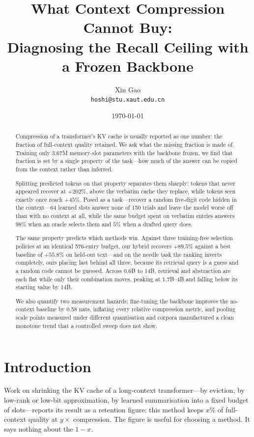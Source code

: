\documentclass[11pt]{article}
\title{What Context Compression Cannot Buy:\\
       Diagnosing the Recall Ceiling with a Frozen Backbone}
\author{Xin Gao\\
  \texttt{hoshi@stu.xaut.edu.cn}}
\date{\today}
\begin{document}
\maketitle

\begin{abstract}
Compression of a transformer's KV cache is usually reported as one number: the
fraction of full-context quality retained. We ask what the missing fraction is
made of. Training only 3.67M memory-slot parameters with the backbone frozen,
we find that fraction is set by a single property of the task---how much of the
answer can be copied from the context rather than inferred.

Splitting predicted tokens on that property separates them sharply: tokens that
never appeared recover at $+202\%$, above the verbatim cache they replace, while
tokens seen exactly once reach $+45\%$. Posed as a task---recover a random
five-digit code hidden in the context---64 learned slots answer none of 150
trials and leave the model worse off than with no context at all, while the same
budget spent on verbatim entries answers $98\%$ when an oracle selects them and
$5\%$ when a drafted query does.

The same property predicts which methods win. Against three training-free
selection policies at an identical 576-entry budget, our hybrid recovers
$+89.5\%$ against a best baseline of $+55.8\%$ on held-out text---and on the
needle task the ranking inverts completely, ours placing last behind all three,
because its retrieval query is a guess and a random code cannot be guessed.
Across 0.6B to 14B, retrieval and abstraction are each flat while only their
combination moves, peaking at 1.7B--4B and falling below its starting value by
14B.

We also quantify two measurement hazards: fine-tuning the backbone improves the
no-context baseline by 0.58 nats, inflating every relative compression metric,
and pooling scale points measured under different quantisation and corpora
manufactured a clean monotone trend that a controlled sweep does not show.
\end{abstract}

\section{Introduction}

Work on shrinking the KV cache of a long-context transformer---by eviction, by
low-rank or low-bit approximation, by learned summarisation into a fixed budget
of slots---reports its result as a retention figure: this method keeps $x\%$ of
full-context quality at $y\times$ compression. The figure is useful for choosing
a method. It says nothing about the $1-x$.
\end{document}
